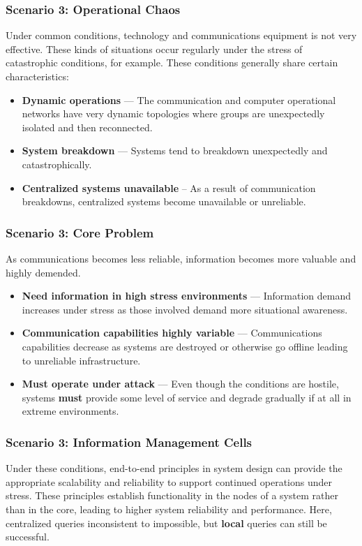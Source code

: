 \documentclass[t,handout, 10pt]{beamer}
\begin{document}
\begin{frame}
\frametitle{Scenario 3: Operational Chaos}
Under common conditions, technology and communications equipment is not very effective.  These kinds of situations occur regularly under the stress of catastrophic conditions, for example.
\newline
\newline
\pause
These conditions generally share certain characteristics:
\begin{itemize}
\item \textbf{Dynamic operations} --- The communication and computer operational networks have very dynamic topologies where groups are unexpectedly isolated and then reconnected.
\pause
\item \textbf{System breakdown} --- Systems tend to breakdown unexpectedly and catastrophically.
\pause
\item \textbf{Centralized systems unavailable} -- As a result of communication breakdowns, centralized systems become unavailable or unreliable.
\end{itemize}
\end{frame}

\begin{frame}
\frametitle{Scenario 3: Core Problem}
As communications becomes less reliable, information becomes more valuable and highly demended.
\newline
\newline
\pause
\begin{itemize}
\item \textbf{Need information in high stress environments} --- Information demand increases under stress as those involved demand more situational awareness.
\pause
\item \textbf{Communication capabilities highly variable} --- Communications capabilities decrease as systems are destroyed or otherwise go offline leading to unreliable infrastructure.
\pause
\item \textbf{Must operate under attack} --- Even though the conditions are hostile, systems \textbf{must} provide some level of service and degrade gradually if at all in extreme environments.
\end{itemize}
\end{frame}

\begin{frame}
\frametitle{Scenario 3: Information Management Cells}
Under these conditions, end-to-end principles in system design can provide the appropriate scalability and reliability to support continued operations under stress.  
\newline
\newline
\pause
These principles establish functionality in the nodes of a system rather than in the core, leading to higher system reliability and performance.  
\newline
\newline
\pause
Here, centralized queries inconsistent to impossible, but \textbf{local} queries can still be successful.
\end{frame}
\end{document}
